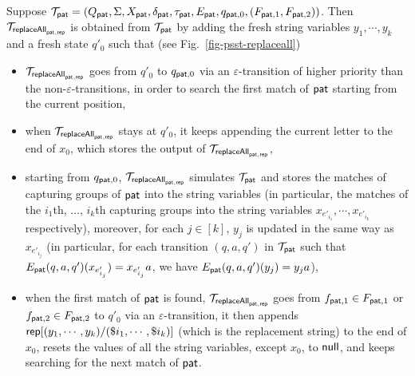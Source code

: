 Suppose $\mathcal{T}_{\mathsf{pat}} = (Q_{\mathsf{pat}}, \Sigma, X_{\mathsf{pat}}, \delta_{\mathsf{pat}}, \tau_{\mathsf{pat}}, E_{\mathsf{pat}}, q_{\mathsf{pat},0}, (F_{\mathsf{pat},1}, F_{\mathsf{pat},2}))$.
Then $\mathcal{T}_{\mathsf{replaceAll}_{\mathsf{pat},\mathsf{rep}}}$ is obtained from $\mathcal{T}_{\mathsf{pat}}$ by adding the fresh string variables $y_1, \cdots, y_k$ and a fresh state $q'_0$ such that (see Fig.~\ref{fig-psst-replaceall})
\begin{itemize}
    \item $\mathcal{T}_{\mathsf{replaceAll}_{\mathsf{pat},\mathsf{rep}}}$ goes from $q'_0$ to $q_{\mathsf{pat},0}$ via an $\varepsilon$-transition of higher priority than the non-$\varepsilon$-transitions, in order to search the first match of $\mathsf{pat}$ starting from the current position,
    \item when $\mathcal{T}_{\mathsf{replaceAll}_{\mathsf{pat},\mathsf{rep}}}$ stays at $q'_0$, it keeps appending the current letter to the end of $x_0$, which stores the output of $\mathcal{T}_{\mathsf{replaceAll}_{\mathsf{pat},\mathsf{rep}}}$,
    \item starting from $q_{\mathsf{pat}, 0}$, $\mathcal{T}_{\mathsf{replaceAll}_{\mathsf{pat},\mathsf{rep}}}$ simulates $\mathcal{T}_{\mathsf{pat}}$ and stores the matches of capturing groups of $\mathsf{pat}$ into the string variables (in particular,
    the matches of the $i_1$th, $\ldots$, $i_k$th capturing groups into the string variables $x_{e'_{i_1}}, \cdots, x_{e'_{i_k}}$ respectively), moreover, for each $j \in [k]$, $y_j$ is updated in the same way as $x_{e'_{i_j}}$ (in particular, for each transition $(q, a, q')$ in $\mathcal{T}_{\mathsf{pat}}$ such that $E_{\mathsf{pat}}(q, a, q')(x_{e'_{i_j}}) = x_{e'_{i_j}} a$,  we have $E_{\mathsf{pat}}(q, a, q')(y_j) = y_j a$),

    \item when the first match of $\mathsf{pat}$ is found, $\mathcal{T}_{\mathsf{replaceAll}_{\mathsf{pat},\mathsf{rep}}}$ goes from $f_{\mathsf{pat},1} \in F_{\mathsf{pat}, 1}$ or $f_{\mathsf{pat}, 2} \in F_{\mathsf{pat}, 2}$ to $q'_0$ via an $\varepsilon$-transition, it then appends $\mathsf{rep}[(y_1, \cdots, y_k)/(\$i_1,\cdots, \$i_k)]$ (which is the replacement string) to the end of $x_0$, resets the values of all the string variables, except $x_0$, to $\mathsf{null}$, and keeps searching for the next match of $\mathsf{pat}$.
\end{itemize}

